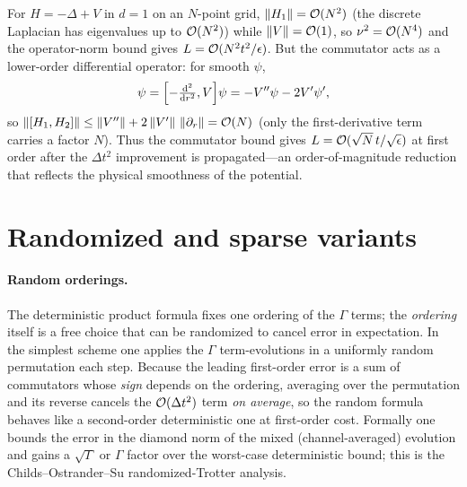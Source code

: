 \begin{example}
\label{exa:lec11-comm-pde}
For $H=-\Delta+V$ in $d=1$ on an $N$-point grid, $\left\lVert H_1 \right\rVert=\mathcal{O}(N^2)$ (the discrete
Laplacian has eigenvalues up to $\mathcal{O}(N^2)$) while $\left\lVert V \right\rVert=\mathcal{O}(1)$, so
$\nu^2=\mathcal{O}(N^4)$ and the operator-norm bound gives $L=\mathcal{O}(N^2t^2/\epsilon)$. But the
commutator acts as a lower-order differential operator: for smooth $\psi$,
\begin{equation}
  [H_1,H_2]\psi=\Bigl[-\tfrac{\dd^2}{\dd r^2},V\Bigr]\psi=-V''\psi-2V'\psi',
\end{equation}
so $\left\lVert [H_1,H_2] \right\rVert\le\left\lVert V'' \right\rVert+2\left\lVert V' \right\rVert\,\left\lVert \partial_r \right\rVert=\mathcal{O}(N)$ (only the
first-derivative term carries a factor $N$). Thus the commutator bound gives
$L=\mathcal{O}(\sqrt N\,t/\sqrt\epsilon)$ at first order after the $\Delta t^2$ improvement is
propagated---an order-of-magnitude reduction that reflects the physical smoothness of the
potential.
\end{example}

\section{Randomized and sparse variants}
\label{sec:lec11-5}

\paragraph{Random orderings.}
The deterministic product formula fixes one ordering of the $\Gamma$ terms; the
\emph{ordering} itself is a free choice that can be randomized to cancel error in
expectation. In the simplest scheme one applies the $\Gamma$ term-evolutions in a
uniformly random permutation each step. Because the leading first-order error is a sum of
commutators whose \emph{sign} depends on the ordering, averaging over the permutation and
its reverse cancels the $\mathcal{O}(\Delta t^2)$ term \emph{on average}, so the random formula
behaves like a second-order deterministic one at first-order cost. Formally one bounds the
error in the diamond norm of the mixed (channel-averaged) evolution and gains a
$\sqrt\Gamma$ or $\Gamma$ factor over the worst-case deterministic bound; this is the
Childs--Ostrander--Su randomized-Trotter analysis.

